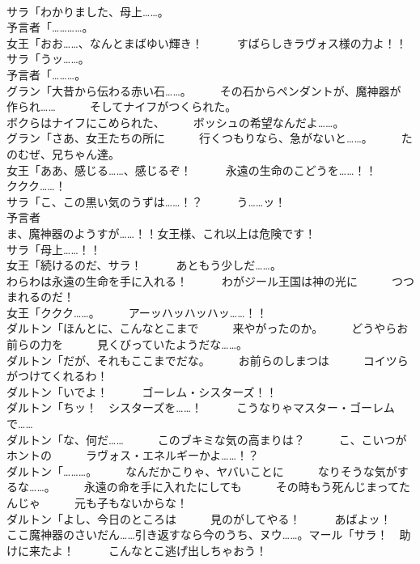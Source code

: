 \documentclass[8pt]{extreport}
\begin{document}
\begin{CJK}{UTF8}{min}
\\	サラ「わかりました、母上……。	
\\	予言者「…………。	
\\	女王「おお……、なんとまばゆい輝き！　　　すばらしきラヴォス様の力よ！！	
\\	サラ「うッ……。	
\\	予言者「………。	
\\	グラン「大昔から伝わる赤い石……。　　　その石からペンダントが、魔神器が　　　作られ……　　　そしてナイフがつくられた。	
\\	ボクらはナイフにこめられた、　　　ボッシュの希望なんだよ……。	
\\	グラン「さあ、女王たちの所に　　　行くつもりなら、急がないと……。　　　たのむぜ、兄ちゃん達。	
\\	女王「ああ、感じる……、感じるぞ！　　　永遠の生命のこどうを……！！　　　ククク……！	
\\	サラ「こ、この黒い気のうずは……！？　　　う……ッ！	
\\	予言者
\\	ま、魔神器のようすが……！！女王様、これ以上は危険です！	
\\	サラ「母上……！！	
\\	女王「続けるのだ、サラ！　　　あともう少しだ……。	
\\	わらわは永遠の生命を手に入れる！　　　わがジール王国は神の光に　　　つつまれるのだ！	
\\	女王「ククク……。　　　アーッハッハッハッ……！！	
\\	ダルトン「ほんとに、こんなとこまで　　　来やがったのか。　　　どうやらお前らの力を　　　見くびっていたようだな……。	
\\	ダルトン「だが、それもここまでだな。　　　お前らのしまつは　　　コイツらがつけてくれるわ！	
\\	ダルトン「いでよ！　　　ゴーレム・シスターズ！！	
\\	ダルトン「ちッ！　シスターズを……！　　　こうなりゃマスター・ゴーレムで……	
\\	ダルトン「な、何だ……　　　このブキミな気の高まりは？　　　こ、こいつがホントの　　　ラヴォス・エネルギーかよ……！？	
\\	ダルトン「………。　　　なんだかこりゃ、ヤバいことに　　　なりそうな気がするな……。　　　永遠の命を手に入れたにしても　　　その時もう死んじまってたんじゃ　　　元も子もないからな！	
\\	ダルトン「よし、今日のところは　　　見のがしてやる！　　　あばよッ！	
\\	ここ魔神器のさいだん……引き返すなら今のうち、ヌウ……。マール「サラ！　助けに来たよ！　　　こんなとこ逃げ出しちゃおう！	

\end{CJK}
\end{document}
